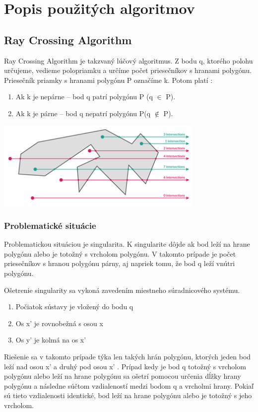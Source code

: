 \documentclass[12pt]{article}
\begin{document}
\section {Popis použitých algoritmov}
\subsection {Ray Crossing Algorithm}
Ray Crossing Algorithm je takzvaný lúčový algoritmus. Z bodu q, ktorého polohu určujeme, vedieme polopriamku a určíme počet priesečníkov s hranami polygónu. Priesečník priamky s hranami polygónu P označíme k. Potom platí :
\begin{enumerate}
\item Ak k je nepárne – bod q patrí polygónu P (q  $\in$ P).
\item Ak k je párne – bod q nepatrí polygónu P(q  $\notin$ P).
\end{enumerate}

\begin{center}
   \includegraphics[width=10cm]{./img/ray_algo.png}
\end{center}

\subsubsection {Problematické situácie}
Problematickou situáciou je singularita. K singularite dôjde ak bod leží na hrane polygónu alebo je totožný s vrcholom polygónu. V takomto prípade je počet priesečníkov s hranou polygónu párny, aj napriek tomu, že bod q leží vnútri polygónu.

Ošetrenie singularity sa vykoná zavedením miestneho súradnicového systému.
\begin{enumerate}
\item Počiatok sústavy je vložený do bodu q
\item Os x' je rovnobežná s osou x
\item Os y' je kolmá na os x'
\end{enumerate}	
Riešenie sa v takomto prípade týka len takých hrán polygónu, ktorých jeden bod leží nad osou x' a druhý pod osou x' . Prípad kedy je bod q totožný s vrcholom polygónu alebo leží na hrane polygónu sa ošetrí pomocou určenia dĺžky hrany polygónu a následne súčtom vzdialeností medzi bodom q a vrcholmi hrany. Pokiaľ sú tieto vzdialenosti identické, bod leží na hrane polygónu alebo je totožný s jeho vrcholom.
\end{document}
